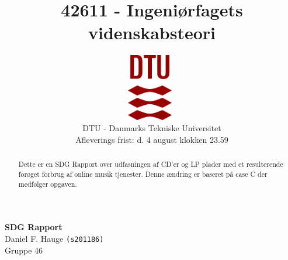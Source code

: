 \documentclass[a4paper]{article}
\begin{document}
\title{42611 - Ingeniørfagets videnskabsteori}
\author{
\includegraphics[width=0.15\textwidth]{images/dtu.eps}~\\[1cm]
    DTU - Danmarks Tekniske Universitet
    \\[0.5cm]
    Afleverings frist: d. 4 august klokken 23.59
    \\
}
\date{} %
\color{black}
\maketitle
\begin{center}
{ \huge \bfseries SDG Rapport}\\

\vspace{.25cm}
Daniel F. Hauge \texttt{(s201186)}\\
Gruppe 46


\vspace{.25cm}
\end{center}

\begin{abstract}
Dette er en SDG Rapport over udfasningen af CD'er og LP plader med et resulterende forøget forbrug af online musik tjenester. Denne ændring er baseret på case C der medfølger opgaven. 
\end{abstract}

\medskip
\newpage


\end{document}
